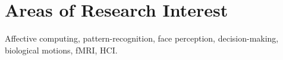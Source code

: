 \section{Areas of Research Interest}

Affective computing, pattern-recognition, face perception, decision-making, biological motions, fMRI, HCI.













